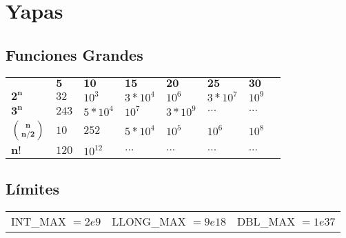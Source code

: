 \documentclass{article}
\begin{document}
\tableofcontents


\pagebreak


\pagebreak


\section{Yapas}

\subsection*{Funciones Grandes}

\begin{tabularx}{0.33\textwidth}{YYYYYYYY}
                      & $\mathbf{5}$ & $\mathbf{10}$ & $\mathbf{15}$ & $\mathbf{20}$ & $\mathbf{25}$ & $\mathbf{30}$ \\
     $\mathbf{2^n}$            & $32$  & $10^3$    & $3*10^4$ & $10^6$   & $3*10^7$ & $10^9$ \\
     $\mathbf{3^n}$            & $243$ & $5*10^4$  & $10^7$   & $3*10^9$ & $...$    & $...$ \\
     $\mathbf{\binom{n}{n/2}}$ & $10$  & $252$     & $5*10^4$ & $10^5$   & $10^6$   & $10^8$ \\
     $\mathbf{n!}$             & $120$ & $10^{12}$ & $...$    & $...$    & $...$    & $...$
\end{tabularx}

\subsection*{Límites}
\begin{tabular}{ccc}
    INT\_MAX $= 2e9$ & LLONG\_MAX $= 9e18$ & DBL\_MAX $= 1e37$
\end{tabular}


\pagebreak



\pagebreak

\pagebreak

\pagebreak

\pagebreak

\pagebreak

\listoftodos[TODOs]
\end{document}
